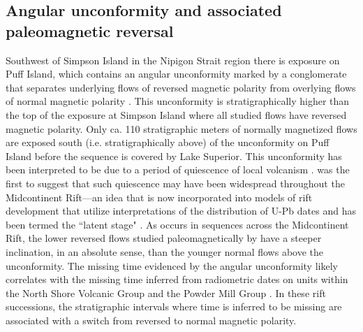 \documentclass[draft,gc]{AGUTeX}
\begin{document}
\begin{article}
\subsection{Angular unconformity and associated paleomagnetic reversal}

Southwest of Simpson Island in the Nipigon Strait region there is exposure on Puff Island, which contains an angular unconformity marked by a conglomerate that separates underlying flows of reversed magnetic polarity from overlying flows of normal magnetic polarity \citep{Halls1974a}. This unconformity is stratigraphically higher than the top of the exposure at Simpson Island where all studied flows have reversed magnetic polarity. Only ca. 110 stratigraphic meters of normally magnetized flows are exposed south (i.e. stratigraphically above) of the unconformity on Puff Island before the sequence is covered by Lake Superior. This unconformity has been interpreted to be due to a period of quiescence of local volcanism \citep{Halls1974a}. \citet{Halls1974a} was the first to suggest that such quiescence may have been widespread throughout the Midcontinent Rift---an idea that is now incorporated into models of rift development that utilize interpretations of the distribution of U-Pb dates and has been termed the ``latent stage" \citep{Vervoort2007a}. As occurs in sequences across the Midcontinent Rift, the lower reversed flows studied paleomagnetically by \citet{Halls1974a} have a steeper inclination, in an absolute sense, than the younger normal flows above the unconformity. The missing time evidenced by the angular unconformity likely correlates with the missing time inferred from radiometric dates on units within the North Shore Volcanic Group and the Powder Mill Group \citep{Davis1997a, Zartman1997a}. In these rift successions, the stratigraphic intervals where time is inferred to be missing are associated with a switch from reversed to normal magnetic polarity.

%
%
%


\end{article}
\end{document}
